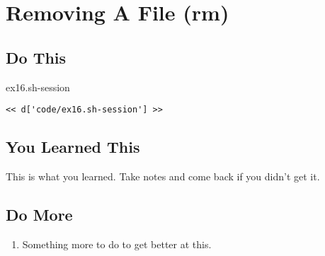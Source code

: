 \chapter{Removing A File (rm)}

\section{Do This}

\begin{code}{ex16.sh-session}
\begin{Verbatim}
<< d['code/ex16.sh-session'] >>
\end{Verbatim}
\end{code}


\section{You Learned This}

This is what you learned.  Take notes and come back if you didn't get it.

\section{Do More}

\begin{enumerate}
\item Something more to do to get better at this.
\end{enumerate}

